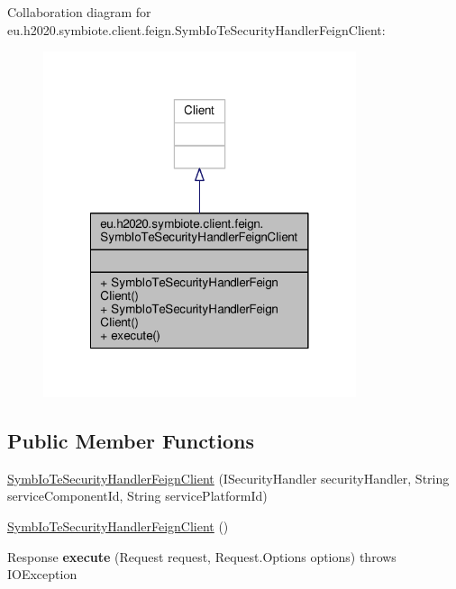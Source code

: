 Collaboration diagram for eu.\+h2020.\+symbiote.\+client.\+feign.\+Symb\+Io\+Te\+Security\+Handler\+Feign\+Client\+:
\nopagebreak
\begin{figure}[H]
\begin{center}
\leavevmode
\includegraphics[width=260pt]{classeu_1_1h2020_1_1symbiote_1_1client_1_1feign_1_1SymbIoTeSecurityHandlerFeignClient__coll__graph}
\end{center}
\end{figure}
\subsection*{Public Member Functions}
\begin{DoxyCompactItemize}
\item 
\hyperlink{classeu_1_1h2020_1_1symbiote_1_1client_1_1feign_1_1SymbIoTeSecurityHandlerFeignClient_a3996d6cfc39a16cf76894fb85e9bc14c}{Symb\+Io\+Te\+Security\+Handler\+Feign\+Client} (I\+Security\+Handler security\+Handler, String service\+Component\+Id, String service\+Platform\+Id)
\item 
\hyperlink{classeu_1_1h2020_1_1symbiote_1_1client_1_1feign_1_1SymbIoTeSecurityHandlerFeignClient_a01f094cab352e880e62d24a73e5c4d10}{Symb\+Io\+Te\+Security\+Handler\+Feign\+Client} ()
\item 
\mbox{\label{classeu_1_1h2020_1_1symbiote_1_1client_1_1feign_1_1SymbIoTeSecurityHandlerFeignClient_aa71bfc84345efbd54bba883d0a32fa4e}} 
Response {\bfseries execute} (Request request, Request.\+Options options)  throws I\+O\+Exception 
\end{DoxyCompactItemize}


